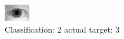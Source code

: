 \begin{figure}[h!]
\begin{center}
\includegraphics[width=0.60\columnwidth]{figures/ID1065_class_2_target_3.png}
\end{center}
\caption{ Classification: 2 actual target: 3}
\label{fig:ID1065_class_2_target_3}
\end{figure}

